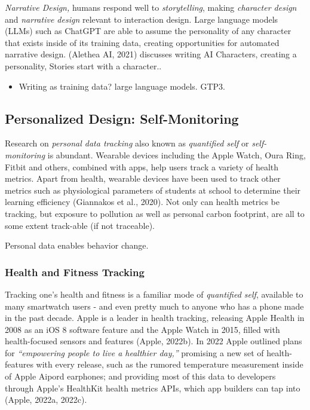 \documentclass[
  letterpaper,
  DIV=11,
  numbers=noendperiod]{scrartcl}
\providecommand{\tightlist}{%
  \setlength{\itemsep}{0pt}\setlength{\parskip}{0pt}}\usepackage{longtable,booktabs,array}
\begin{document}
\emph{Narrative Design,} humans respond well to \emph{storytelling},
making \emph{character design} and \emph{narrative design} relevant to
interaction design. Large language models (LLMs) such as ChatGPT are
able to assume the personality of any character that exists inside of
its training data, creating opportunities for automated narrative
design. (Alethea AI, 2021) discusses writing AI Characters, creating a
personality, Stories start with a character..

\begin{itemize}
\tightlist
\item
  Writing as training data? large language models. GTP3.
\end{itemize}

\subsection{Personalized Design:
Self-Monitoring}\label{personalized-design-self-monitoring}

Research on \emph{personal data tracking} also known as \emph{quantified
self} or \emph{self-monitoring} is abundant. Wearable devices including
the Apple Watch, Oura Ring, Fitbit and others, combined with apps, help
users track a variety of health metrics. Apart from health, wearable
devices have been used to track other metrics such as physiological
parameters of students at school to determine their learning efficiency
(Giannakos et al., 2020). Not only can health metrics be tracking, but
exposure to pollution as well as personal carbon footprint, are all to
some extent track-able (if not traceable).

Personal data enables behavior change.

\subsubsection{Health and Fitness
Tracking}\label{health-and-fitness-tracking}

Tracking one's health and fitness is a familiar mode of \emph{quantified
self}, available to many smartwatch users - and even pretty much to
anyone who has a phone made in the past decade. Apple is a leader in
health tracking, releasing Apple Health in 2008 as an iOS 8 software
feature and the Apple Watch in 2015, filled with health-focused sensors
and features (Apple, 2022b). In 2022 Apple outlined plans for
\emph{``empowering people to live a healthier day,''} promising a new
set of health-features with every release, such as the rumored
temperature measurement inside of Apple Aipord earphones; and providing
most of this data to developers through Apple's HealthKit health metrics
APIs, which app builders can tap into (Apple, 2022a, 2022c).
\end{document}
